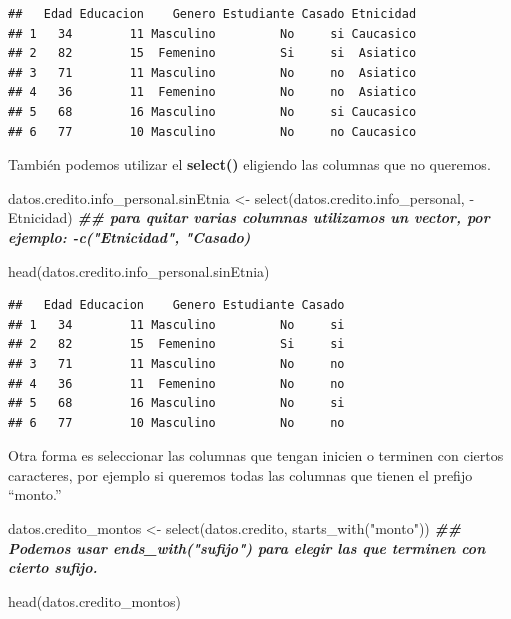 \documentclass[
  12pt,
]{book}
\newenvironment{Shaded}{\begin{snugshade}}{\end{snugshade}}
\newcommand{\DocumentationTok}[1]{\textcolor[rgb]{0.56,0.35,0.01}{\textbf{\textit{#1}}}}
\newcommand{\FunctionTok}[1]{\textcolor[rgb]{0.00,0.00,0.00}{#1}}
\newcommand{\NormalTok}[1]{#1}
\newcommand{\OtherTok}[1]{\textcolor[rgb]{0.56,0.35,0.01}{#1}}
\newcommand{\SpecialCharTok}[1]{\textcolor[rgb]{0.00,0.00,0.00}{#1}}
\newcommand{\StringTok}[1]{\textcolor[rgb]{0.31,0.60,0.02}{#1}}
\begin{document}
\begin{verbatim}
##   Edad Educacion    Genero Estudiante Casado Etnicidad
## 1   34        11 Masculino         No     si Caucasico
## 2   82        15  Femenino         Si     si  Asiatico
## 3   71        11 Masculino         No     no  Asiatico
## 4   36        11  Femenino         No     no  Asiatico
## 5   68        16 Masculino         No     si Caucasico
## 6   77        10 Masculino         No     no Caucasico
\end{verbatim}

También podemos utilizar el \textbf{select()} eligiendo las columnas que no queremos.

\begin{Shaded}
\begin{Highlighting}[]
\NormalTok{datos.credito.info\_personal.sinEtnia }\OtherTok{\textless{}{-}} \FunctionTok{select}\NormalTok{(datos.credito.info\_personal, }\SpecialCharTok{{-}}\NormalTok{Etnicidad)  }\DocumentationTok{\#\# para quitar varias columnas utilizamos un vector, por ejemplo: {-}c("Etnicidad", "Casado)}

\FunctionTok{head}\NormalTok{(datos.credito.info\_personal.sinEtnia)}
\end{Highlighting}
\end{Shaded}

\begin{verbatim}
##   Edad Educacion    Genero Estudiante Casado
## 1   34        11 Masculino         No     si
## 2   82        15  Femenino         Si     si
## 3   71        11 Masculino         No     no
## 4   36        11  Femenino         No     no
## 5   68        16 Masculino         No     si
## 6   77        10 Masculino         No     no
\end{verbatim}

Otra forma es seleccionar las columnas que tengan inicien o terminen con ciertos caracteres, por ejemplo si queremos todas las columnas que tienen el prefijo ``monto.''

\begin{Shaded}
\begin{Highlighting}[]
\NormalTok{datos.credito\_montos }\OtherTok{\textless{}{-}} \FunctionTok{select}\NormalTok{(datos.credito, }\FunctionTok{starts\_with}\NormalTok{(}\StringTok{"monto"}\NormalTok{)) }\DocumentationTok{\#\# Podemos usar ends\_with("sufijo") para elegir las que terminen con cierto sufijo.}

\FunctionTok{head}\NormalTok{(datos.credito\_montos)}
\end{Highlighting}
\end{Shaded}
\end{document}
